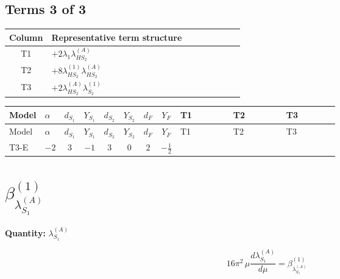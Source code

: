 \documentclass[8pt]{article}
\begin{document}
\begin{landscape}
\subsection*{Terms 3 of 3}
\begin{center}
\begin{tabular}{@{}c >{\raggedright\arraybackslash}p{0.82\linewidth}@{}}
\toprule
Column & Representative term structure \\
\midrule
T1 & \(\displaystyle +2 {\lambda_1} {\lambda_{HS_2}^{(A)}}\) \\
\midrule
T2 & \(\displaystyle +8 {\lambda_{HS_2}^{(1)}} {\lambda_{HS_2}^{(A)}}\) \\
\midrule
T3 & \(\displaystyle +2 {\lambda_{HS_2}^{(A)}} {\lambda_{S_2}^{(1)}}\) \\
\midrule
\bottomrule
\end{tabular}
\end{center}
\smallskip
\tiny
\begin{longtable}{@{}llcccccc >{\raggedright\arraybackslash}p{0.21\linewidth} >{\raggedright\arraybackslash}p{0.21\linewidth} >{\raggedright\arraybackslash}p{0.21\linewidth}@{}}
\toprule
Model & $\alpha$ & $d_{S_1}$ & $Y_{S_1}$ & $d_{S_2}$ & $Y_{S_2}$ & $d_F$ & $Y_F$ & T1 & T2 & T3 \\
\midrule
\endfirsthead
\toprule
Model & $\alpha$ & $d_{S_1}$ & $Y_{S_1}$ & $d_{S_2}$ & $Y_{S_2}$ & $d_F$ & $Y_F$ & T1 & T2 & T3 \\
\midrule
\endhead
T3-E & $-2$ & $3$ & $-1$ & $3$ & $0$ & $2$ & $-\frac{1}{2}$ & \scriptsize\adjustbox{max width=\linewidth}{$\begin{gathered} +2 {\lambda_1} {\lambda_{HS_2}^{(A)}}\end{gathered}$} & \scriptsize\adjustbox{max width=\linewidth}{$\begin{gathered} +8 {\lambda_{HS_2}^{(1)}} {\lambda_{HS_2}^{(A)}}\end{gathered}$} & \scriptsize\adjustbox{max width=\linewidth}{$\begin{gathered} +2 {\lambda_{HS_2}^{(A)}} {\lambda_{S_2}^{(1)}}\end{gathered}$} \\
\midrule
\bottomrule
\end{longtable}
\clearpage
\section*{$\beta_{\lambda_{S_1}^{(A)}}^{(1)}$}
\noindent\textbf{Quantity: }$\lambda_{S_1}^{(A)}$\par\smallskip
\[16\pi^2\,\mu\frac{d \lambda_{S_1}^{(A)}}{d\mu}=\beta_{\lambda_{S_1}^{(A)}}^{(1)}\]

\end{landscape}
\end{document}
